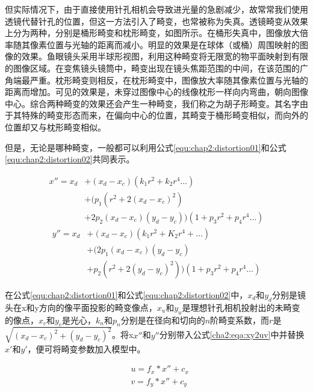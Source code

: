 但实际情况下，由于直接使用针孔相机会导致进光量的急剧减少，故常常我们使用透镜代替针孔的位置，但这一方法引入了畸变，也常被称为失真。透镜畸变从效果上分为两种，分别是桶形畸变和枕形畸变，如图所示。在桶形失真中，图像放大倍率随其像素位置与光轴的距离而减小。明显的效果是在球体（或桶）周围映射的图像的效果。鱼眼镜头采用半球形视图，利用这种畸变将无限宽的物平面映射到有限的图像区域。在变焦镜头镜筒中，畸变出现在镜头焦距范围的中间，在该范围的广角端最严重。枕形畸变则相反，在枕形畸变中，图像放大率随其像素位置与光轴的距离而增加。可见的效果是，未穿过图像中心的线像枕形一样向内弯曲，朝向图像中心。综合两种畸变的效果还会产生一种畸变，我们称之为胡子形畸变。其名字由于其特殊的畸变形态而来，在偏向中心的位置，其畸变于桶形畸变相似，而向外的位置却又与枕形畸变相似。

但是，无论是哪种畸变，一般都可以利用公式\ref{equ:chap2:distortion01}和公式\ref{equ:chap2:distortion02}共同表示。

\begin{equation}
\label{equ:chap2:distortion01}
\begin{aligned}
x'' = x_d &+ (x_d - x_c)(k_1r^2 + k_2r^4 \dots)\\&+(p_1(r^2 + 2(x_d - x_c)^2)\\&+ 2p_2(x_d - x_c)(y_d - y_c))(1 + p_3r^2 + p_4r^4 \dots)
\end{aligned}
\end{equation}
\begin{equation}
\label{equ:chap2:distortion02}
\begin{aligned}
y'' = x_d &+ (x_d - x_c)(k_1r^2 + K_2r^4 + \dots)\\&+(2p_1(x_d - x_c)(y_d - y_c) \\&+ p_2(r^2 + 2(y_d - y_c)^2))(1 + p_3r^2 + p_4r^4 \dots)
\end{aligned}
\end{equation}

在公式\ref{equ:chap2:distortion01}和公式\ref{equ:chap2:distortion02}中，$x_d$和$y_d$分别是镜头在x和y方向的像平面投影的畸变像点，$x_u$和$y_u$是理想针孔相机投射出的未畸变的像点，$x_c$和$y_c$是光心，$k_n$和$p_n$分别是在径向和切向的$n$阶畸变系数，而$r$是$\sqrt{(x_d - x_c)^2 + (y_d - y_c)^2}$。将x$x''$和$y''$分别带入公式\ref{cha2:eqa:xy2uv}中并替换$x'$和$y'$，便可将畸变参数加入模型中。

\begin{equation}
\label{cha2:equ:cam1}
  \begin{aligned}
    &u = f_x * x'' + c_x\\
    &v = f_y * x'' + c_y
  \end{aligned}
\end{equation}

